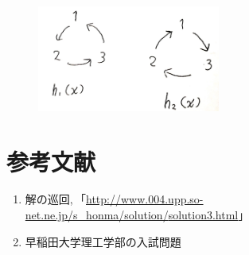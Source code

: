 \begin{figure}[H]
  \centering
  \includegraphics[width=6cm]{tuzi/image/7}
\end{figure}

\section*{参考文献}
\begin{enumerate}
  \item 解の巡回,\,「\url{http://www.004.upp.so-net.ne.jp/s_honma/solution/}\url{solution3.html}」
  \item 早稲田大学理工学部の入試問題
\end{enumerate}






%
